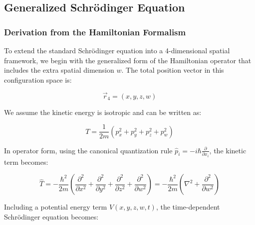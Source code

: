 \documentclass[12pt]{article}
\begin{document}
 \begin{center}
 \end{center}

\subsection{Generalized Schrödinger Equation}

\subsubsection{Derivation from the Hamiltonian Formalism}

To extend the standard Schrödinger equation into a 4-dimensional spatial framework, we begin with the generalized form of the Hamiltonian operator that includes the extra spatial dimension \( w \). The total position vector in this configuration space is:

\begin{equation}
    \vec{r}_4 = (x, y, z, w)
\end{equation}

We assume the kinetic energy is isotropic and can be written as:

\begin{equation}
T = \frac{1}{2m} \left( p_x^2 + p_y^2 + p_z^2 + p_w^2 \right)
\end{equation}

In operator form, using the canonical quantization rule \( \hat{p}_i = -i\hbar \frac{\partial}{\partial x_i} \), the kinetic term becomes:

\begin{equation}
\hat{T} = -\frac{\hbar^2}{2m} \left( \frac{\partial^2}{\partial x^2} + \frac{\partial^2}{\partial y^2} + \frac{\partial^2}{\partial z^2} + \frac{\partial^2}{\partial w^2} \right)
= -\frac{\hbar^2}{2m} \left( \nabla^2 + \frac{\partial^2}{\partial w^2} \right)
\end{equation}

Including a potential energy term \( V(x, y, z, w, t) \), the time-dependent Schrödinger equation becomes:
\end{document}
